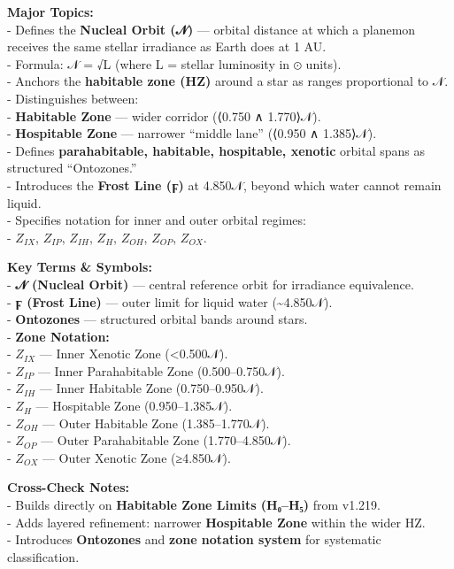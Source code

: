 \documentclass[
  letterpaper,
]{book}
\begin{document}
\textbf{Major Topics:}\\
- Defines the \textbf{Nucleal Orbit (𝒩)} --- orbital distance at which a
planemon receives the same stellar irradiance as Earth does at 1 AU.\\
- Formula: 𝒩 = √L (where L = stellar luminosity in ⊙ units).\\
- Anchors the \textbf{habitable zone (HZ)} around a star as ranges
proportional to 𝒩.\\
- Distinguishes between:\\
- \textbf{Habitable Zone} --- wider corridor (⟨0.750 ∧ 1.770⟩𝒩).\\
- \textbf{Hospitable Zone} --- narrower ``middle lane'' (⟨0.950 ∧
1.385⟩𝒩).\\
- Defines \textbf{parahabitable, habitable, hospitable, xenotic} orbital
spans as structured ``Ontozones.''\\
- Introduces the \textbf{Frost Line (ϝ)} at 4.850𝒩, beyond which water
cannot remain liquid.\\
- Specifies notation for inner and outer orbital regimes:\\
- \(Z_{IX}\), \(Z_{IP}\), \(Z_{IH}\), \(Z_H\), \(Z_{OH}\), \(Z_{OP}\),
\(Z_{OX}\).

\textbf{Key Terms \& Symbols:}\\
- \textbf{𝒩 (Nucleal Orbit)} --- central reference orbit for irradiance
equivalence.\\
- \textbf{ϝ (Frost Line)} --- outer limit for liquid water
(\textasciitilde4.850𝒩).\\
- \textbf{Ontozones} --- structured orbital bands around stars.\\
- \textbf{Zone Notation:}\\
- \(Z_{IX}\) --- Inner Xenotic Zone (\textless0.500𝒩).\\
- \(Z_{IP}\) --- Inner Parahabitable Zone (0.500--0.750𝒩).\\
- \(Z_{IH}\) --- Inner Habitable Zone (0.750--0.950𝒩).\\
- \(Z_H\) --- Hospitable Zone (0.950--1.385𝒩).\\
- \(Z_{OH}\) --- Outer Habitable Zone (1.385--1.770𝒩).\\
- \(Z_{OP}\) --- Outer Parahabitable Zone (1.770--4.850𝒩).\\
- \(Z_{OX}\) --- Outer Xenotic Zone (≥4.850𝒩).

\textbf{Cross-Check Notes:}\\
- Builds directly on \textbf{Habitable Zone Limits (H₀--H₅)} from
v1.219.\\
- Adds layered refinement: narrower \textbf{Hospitable Zone} within the
wider HZ.\\
- Introduces \textbf{Ontozones} and \textbf{zone notation system} for
systematic classification.
\end{document}
